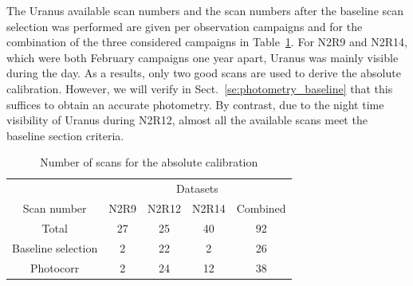 The Uranus available scan numbers and the scan numbers after the baseline scan
selection was performed are given per observation campaigns and for
the combination of the three considered campaigns in
Table~\ref{tab:absolute_calibration_scan_numbers}. For N2R9 and N2R14,
which were both February campaigns one year apart, Uranus was mainly
visible during the day. As a results, only two good scans are used to
derive the absolute calibration. However, we will verify in
Sect.~\ref{se:photometry_baseline} that this suffices to obtain an
accurate photometry. By contrast, due to the night time visibility of
Uranus during N2R12, almost all the available scans meet the baseline
section criteria. 


\begin{table}[th]
\begin{center}
\begin{tabular}{|c|c|c|c|c|c|}
  \hline
  \multicolumn{2}{|c|}{}            &  \multicolumn{4}{|c|}{Datasets} \\\cline{3-6}
  \multicolumn{2}{|c|}{Scan number} &  N2R9  & N2R12  &  N2R14  &  Combined \\
  \hline\hline
  \multicolumn{2}{|c|}{Total}       &   27   &   25    &   40    &    92  \\
  \hline
  \multicolumn{2}{|c|}{Baseline selection}     &   2    &   22    &    2    &    26  \\
  \multicolumn{2}{|c|}{Photocorr}              &   2    &   24    &   12    &    38  \\
\hline\hline
\end{tabular}
\caption[Absolute calibration scan numbers]{Number of scans for the absolute calibration}
\label{tab:absolute_calibration_scan_numbers}
\end{center}
\end{table}



